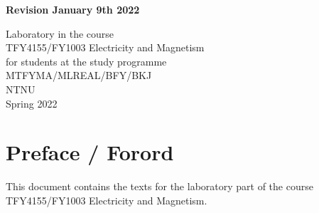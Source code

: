 \documentclass[../Elmag-labhefte-2021.tex]{subfiles}
\begin{document}
{
\centering
\bfseries
\hfill Revision January 9th 2022

\vspace*{40mm}
\LARGE Laboratory in the course\\[10mm]
TFY4155/FY1003 Electricity and Magnetism\\[20mm]    
for students at the study programme\\[10mm]    
MTFYMA/MLREAL/BFY/BKJ \\[15mm]    
NTNU\\[15mm]    
Spring 2022

}


\newpage
\chapter*{Preface / Forord}

This document contains the texts for the laboratory part of the course TFY4155/FY1003 Electricity and Magnetism.




\end{document}
